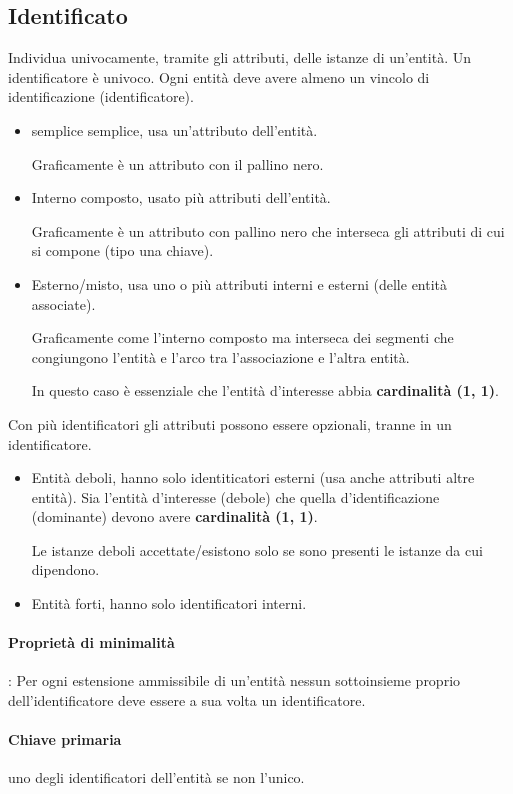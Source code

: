 \subsection{Identificato}
Individua univocamente, tramite gli attributi, delle istanze di un'entità. Un identificatore è univoco. Ogni entità deve avere almeno un vincolo di identificazione (identificatore).
\begin{itemize}
	\item semplice semplice, usa un'attributo dell'entità.

	Graficamente è un attributo con il pallino nero.
	\item Interno composto, usato più attributi dell'entità.

	Graficamente è un attributo con pallino nero che interseca gli attributi di cui si compone (tipo una chiave).
	\item Esterno/misto, usa uno o più attributi interni e esterni (delle entità associate).

	Graficamente come l'interno composto ma interseca dei segmenti che congiungono l'entità e l'arco tra l'associazione e l'altra entità.

	In questo caso è essenziale che l'entità d'interesse abbia \textbf{cardinalità (1, 1)}.

\end{itemize}
Con più identificatori gli attributi possono essere opzionali, tranne in un identificatore.
\begin{itemize}
	\item Entità deboli, hanno solo identiticatori esterni (usa anche attributi altre entità). Sia l'entità d'interesse (debole) che quella d'identificazione (dominante) devono avere \textbf{cardinalità (1, 1)}.

	Le istanze deboli accettate/esistono solo se sono presenti le istanze da cui dipendono.
	\item Entità forti, hanno solo identificatori interni.
\end{itemize}
\paragraph{Proprietà di minimalità}: Per ogni estensione ammissibile di un'entità nessun sottoinsieme proprio dell'identificatore deve essere a sua volta un identificatore.
\paragraph{Chiave primaria} uno degli identificatori dell'entità se non l'unico.

